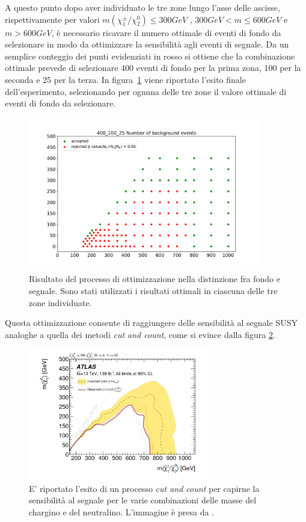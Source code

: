 A questo punto dopo aver individuato le tre zone lungo l'asse delle ascisse, rispettivamente per valori $ m(\chi^\pm_1/\chi^0_2) \le 300 GeV$ , $300 GeV < m \le 600 GeV$ e $m > 600 GeV$, è necessario ricavare il numero ottimale di eventi di fondo da selezionare in modo da ottimizzare la sensibilità agli eventi di segnale. Da un semplice conteggio dei punti evidenziati in rosso si ottiene che la combinazione ottimale prevede di selezionare 400 eventi di fondo per la prima zona, 100 per la seconda e 25 per la terza. In figura~\ref{mix} viene riportato l'esito finale dell'esperimento, selezionando per ognuna delle tre zone il valore ottimale di eventi di fondo da selezionare.

\begin{figure}[h!]
	\centering
	\includegraphics[width=0.90\textwidth]{figs/risultati_simulazione/mix.pdf}
	\caption{Risultato del processo di ottimizzazione nella distinzione fra fondo e segnale. Sono stati utilizzati i risultati ottimali in ciascuna delle tre zone individuate.}
	\label{mix}
\end{figure}

Questa ottimizzazione consente di raggiungere delle sensibilità al segnale SUSY analoghe a quella dei metodi \textit{cut and count}, come si evince dalla figura \ref{confronto}.

\newpage

\begin{figure}[h!]
	\centering
	\includegraphics[width=0.70\textwidth]{figs/risultati_simulazione/confronto.png}
	\caption{E' riportato l'esito di un processo \textit{cut and count} per capirne la sensibilità al segnale per le varie combinazioni delle masse del chargino e del neutralino. L'immagine è presa da \cite{susy_alberto}.}
	\label{confronto}
\end{figure}

